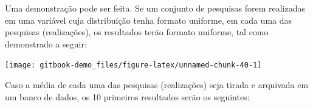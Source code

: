 \documentclass[
]{book}
\newenvironment{Shaded}{\begin{snugshade}}{\end{snugshade}}
\newcommand{\KeywordTok}[1]{\textcolor[rgb]{0.13,0.29,0.53}{\textbf{#1}}}
\newcommand{\NormalTok}[1]{#1}
\newcommand{\OperatorTok}[1]{\textcolor[rgb]{0.81,0.36,0.00}{\textbf{#1}}}
\newcommand{\StringTok}[1]{\textcolor[rgb]{0.31,0.60,0.02}{#1}}
\begin{document}
Uma demonstração pode ser feita. Se um conjunto de pesquisas forem realizadas em uma variável cuja distribuição tenha formato uniforme, em cada uma das pesquisas (realizações), os resultados terão formato uniforme, tal como demonstrado a seguir:

\begin{center}\texttt{[image: gitbook-demo\_files/figure-latex/unnamed-chunk-40-1]} \end{center}

Caso a média de cada uma das pesquisas (realizações) seja tirada e arquivada em um banco de dados, os 10 primeiros resultados serão os seguintes:

\begin{Shaded}
\end{Shaded}
\end{document}
